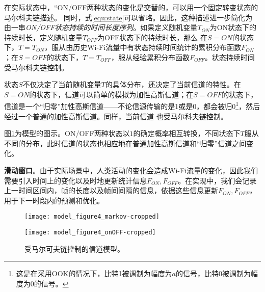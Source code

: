 在实际状态中，“ON/OFF两种状态的变化是交替的，可以用一个固定转变状态的马尔科夫链描述。
同时，式\ref{equ:state}可以省略。因此，这种描述进一步简化为
由一串\emph{ON/OFF状态持续的时间长度序列}。如果定义随机变量$T_{ON}$为ON状态下的持续时长，定义随机变量$T_{OFF}$为OFF状态下的持续时长，那么
在$S = ON$的状态下，$T = T_{ON}$，服从由历史Wi-Fi流量中有状态持续时间统计的累积分布函数$F_{ON}$；在$S = OFF$的状态下，$T = T_{OFF}$，服从经验累积分布函数$F_{OFF}$。状态持续时间受马尔科夫链控制。

状态$S$不仅决定了当前随机变量$T$的具体分布，还决定了当前信道的特性。在$S = ON$的状态下，信道可以简单的模拟为加性高斯信道；在$S = OFF$的状态下，信道是一个“归零”加性高斯信道——不论信源传输的是1或是0，都会被归0\footnote{这是在采用OOK的情况下，比特1被调制为幅度为$a$的信号，比特0被调制为幅度为0的信号。}，然后经过一个普通的加性高斯信道。同样，当前信道
也受马尔科夫链控制。

图\ref{fig:markov_model}为模型的图示。ON/OFF两种状态以$1$的确定概率相互转换，不同状态下$T$服从不同的分布，此时信道的状态也相应地在普通加性高斯信道和“归零”信道之间变化。

\textbf{滑动窗口}。由于实际场景中，人类活动的变化会造成Wi-Fi流量的变化，因此我们需要引入时间上的变化以及时地更新统计信息$F_{ON},F_{OFF}$。在实现中，我们会记录上一时间区间内，帧的长度以及帧间间隔的信息，依据这些信息更新$F_{ON},F_{OFF}$，用于下一时段内的预测和优化。
\begin{figure}[t]
	\begin{minipage}[b]{.5\linewidth}
		\texttt{[image: model\_figure4\_markov-cropped]}
		\label{fig:markov_chain}
	\end{minipage}
	\hfill
	\begin{minipage}[b]{.5\linewidth}
		\texttt{[image: model\_figure4\_onOFF-cropped]}
		\label{fig:series}
	\end{minipage}
	\caption{受马尔可夫链控制的信道模型。}\label{fig:markov_model}
\end{figure}
